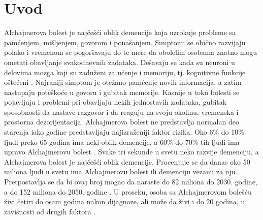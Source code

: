 \documentclass[12pt,oneside]{memoir}
\begin{document}
\frontmatter
\naslovna
\komisija

\tableofcontents{}

\mainmatter


\chapter{Uvod}

Alchajmerova bolest je najčešći oblik demencije koja uzrokuje probleme sa pamćenjem, mišljenjem, govorom i ponašanjem. Simptomi se obično razvijaju polako i vremenom se pogoršavaju do te mere da obolelim osobama znatno mogu ometati obavljanje svakodnevnih zadataka. Dešavaju se kada su neuroni u delovima mozga koji su zaduženi za učenje i memoriju, tj. kognitivne funkcije oštećeni \cite{Alzheimerfactsfigures}. Najraniji simptom je otežano pamćenje novih informacija, a zatim nastupaju poteškoće u govoru i gubitak memorije. Kasnije u toku bolesti se pojavljuju i problemi pri obavljaju nekih jednostavih zadataka, gubitak sposobnosti da nastave razgovor i da reaguju na svoju okolinu, vremenska i prostorna dezorijentacija. Alchajmerova bolest ne predstavlja normalan deo starenja iako godine predstavljaju najizraženiji faktor rizika. Oko 6\% do 10\% ljudi preko 65 godina ima neki oblik demencije, a 60\% do 70\% tih ljudi ima upravo Alchajmerovu bolest \cite{actavis}. Svake tri sekunde u svetu neko razvije demenciju, a Alchajmerova bolest je najčešći oblik demencije. Procenjuje se da danas oko 50 miliona ljudi u svetu ima Alchajmerovu bolest ili demenciju vezanu za nju. Pretpostavlja se da bi ovaj broj mogao da naraste do 82 miliona do 2030. godine, a do 152 miliona do 2050. godine \cite{Languageimpairment}. U proseku, osoba sa Alchajmerovom bolešću živi četiri do osam godina nakon dijagnoze, ali može da živi i do 20 godina, u zavisnosti od drugih faktora \cite{seracell}.
\end{document}
